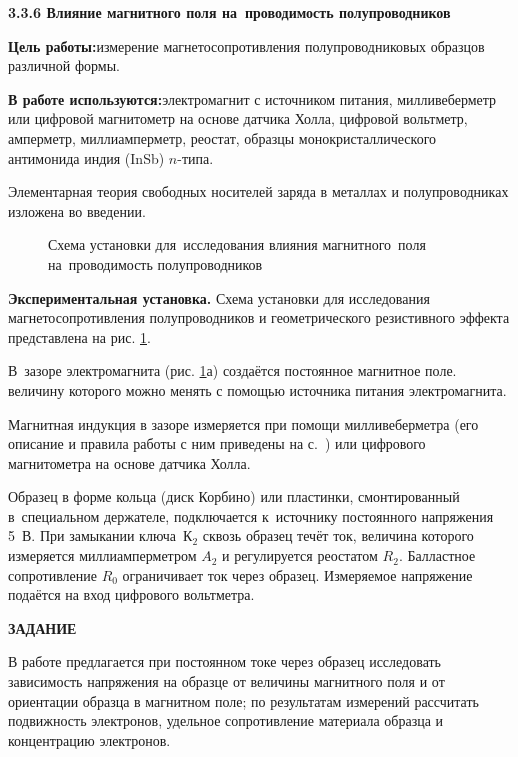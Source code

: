 {\large \bf 3.3.6 Влияние магнитного поля на~проводимость полупроводников}

{\bf Цель работы:}{измерение магнетосопротивления полупроводниковых образцов различной формы.}

{\bf В работе используются:}{электромагнит с источником питания, милливеберметр или цифровой магнитометр на основе датчика Холла, цифровой вольтметр, амперметр, миллиамперметр, реостат, образцы монокристаллического антимонида индия (InSb) $n$-типа.}

Элементарная теория свободных носителей заряда в металлах и полупроводниках изложена во введении.

\begin{figure}
\caption{Схема установки для~исследования влияния магнитного~поля на~проводимость полупроводников}
\label{fig3.6.1}
\end{figure}

{\bf Экспериментальная установка.} Схема установки для исследования магнетосопротивления полупроводников и геометрического резистивного эффекта представлена на рис. \ref{fig3.6.1}.

В~зазоре электромагнита (рис. \ref{fig3.6.1}а) создаётся постоянное магнитное поле. величину которого можно менять с помощью источника питания электромагнита.

Магнитная индукция в зазоре измеряется при помощи милливеберметра (его описание и правила работы с ним приведены на с.~\pageref{MWB}) или цифрового магнитометра на основе датчика Холла.

Образец в форме кольца (диск Корбино) или пластинки, смонтированный в~специальном держателе, подключается к~источнику постоянного напряжения 5~В. При замыкании ключа~К$_2$ сквозь образец течёт ток, величина которого измеряется миллиамперметром $A_2$ и регулируется реостатом $R_2$. Балластное сопротивление $R_0$ ограничивает ток через образец. Измеряемое напряжение подаётся на вход цифрового вольтметра.

{\Large \bf ЗАДАНИЕ}

В работе предлагается при постоянном токе через образец исследовать зависимость напряжения на образце от величины магнитного поля и от ориентации образца в магнитном поле; по результатам измерений рассчитать подвижность электронов, удельное сопротивление материала образца и концентрацию электронов.

